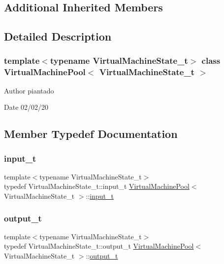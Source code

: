 \subsection*{Additional Inherited Members}


\subsection{Detailed Description}
\subsubsection*{template$<$typename Virtual\+Machine\+State\+\_\+t$>$\newline
class Virtual\+Machine\+Pool$<$ Virtual\+Machine\+State\+\_\+t $>$}

\begin{DoxyAuthor}{Author}
piantado 
\end{DoxyAuthor}
\begin{DoxyDate}{Date}
02/02/20 
\end{DoxyDate}


\subsection{Member Typedef Documentation}
\mbox{\label{class_virtual_machine_pool_a8cbea2d216d16e9d23e074457b2997a0}} 
\subsubsection{\texorpdfstring{input\+\_\+t}{input\_t}}
{\footnotesize\ttfamily template$<$typename Virtual\+Machine\+State\+\_\+t$>$ \\
typedef Virtual\+Machine\+State\+\_\+t\+::input\+\_\+t \hyperlink{class_virtual_machine_pool}{Virtual\+Machine\+Pool}$<$ Virtual\+Machine\+State\+\_\+t $>$\+::\hyperlink{class_virtual_machine_pool_a8cbea2d216d16e9d23e074457b2997a0}{input\+\_\+t}}

\mbox{\label{class_virtual_machine_pool_a1e659e76790f4aa4ae074d82a8c381e1}} 
\subsubsection{\texorpdfstring{output\+\_\+t}{output\_t}}
{\footnotesize\ttfamily template$<$typename Virtual\+Machine\+State\+\_\+t$>$ \\
typedef Virtual\+Machine\+State\+\_\+t\+::output\+\_\+t \hyperlink{class_virtual_machine_pool}{Virtual\+Machine\+Pool}$<$ Virtual\+Machine\+State\+\_\+t $>$\+::\hyperlink{class_virtual_machine_pool_a1e659e76790f4aa4ae074d82a8c381e1}{output\+\_\+t}}




